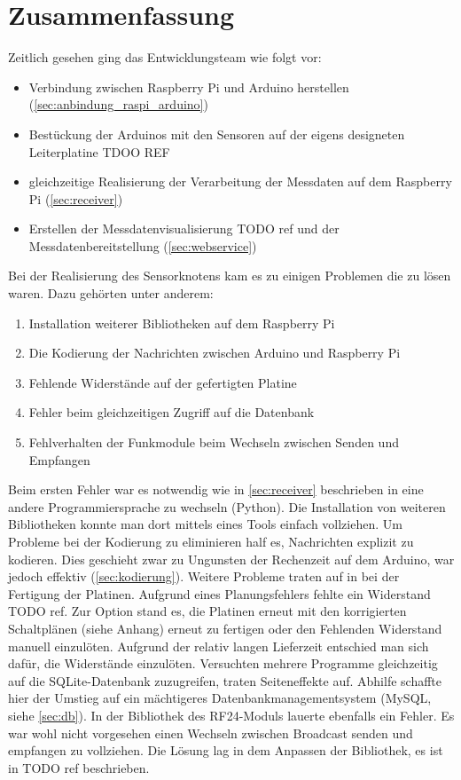 \section{Zusammenfassung}
Zeitlich gesehen ging das Entwicklungsteam wie folgt vor:
\begin{itemize}
\item Verbindung zwischen Raspberry Pi und Arduino herstellen (\ref{sec:anbindung_raspi_arduino})
\item Bestückung der Arduinos mit den Sensoren auf der eigens designeten Leiterplatine TDOO REF
\item gleichzeitige Realisierung der Verarbeitung der Messdaten auf dem Raspberry Pi (\ref{sec:receiver})
\item Erstellen der Messdatenvisualisierung TODO ref und der Messdatenbereitstellung (\ref{sec:webservice}) 
\end{itemize}

Bei der Realisierung des Sensorknotens kam es zu einigen Problemen die zu lösen waren. Dazu gehörten unter anderem:
\begin{enumerate}
\item Installation weiterer Bibliotheken auf dem Raspberry Pi
\item Die Kodierung der Nachrichten zwischen Arduino und Raspberry Pi
\item Fehlende Widerstände auf der gefertigten Platine
\item Fehler beim gleichzeitigen Zugriff auf die Datenbank
\item Fehlverhalten der Funkmodule beim Wechseln zwischen Senden und Empfangen
\end{enumerate}

Beim ersten Fehler war es notwendig wie in  \ref{sec:receiver} beschrieben in eine andere Programmiersprache zu wechseln (Python). Die Installation von weiteren Bibliotheken konnte man dort mittels eines Tools einfach vollziehen. 
Um Probleme bei der Kodierung zu eliminieren half es, Nachrichten explizit zu kodieren. Dies geschieht zwar zu Ungunsten der Rechenzeit auf dem Arduino, war jedoch effektiv (\ref{sec:kodierung}). 
Weitere Probleme traten auf in bei der Fertigung der Platinen. Aufgrund eines Planungsfehlers fehlte ein Widerstand TODO ref. Zur Option stand es, die Platinen erneut mit den korrigierten Schaltplänen (siehe Anhang) erneut zu fertigen oder den Fehlenden Widerstand manuell einzulöten. Aufgrund der relativ langen Lieferzeit entschied man sich dafür, die Widerstände einzulöten.
Versuchten mehrere Programme gleichzeitig auf die SQLite-Datenbank zuzugreifen, traten Seiteneffekte auf. Abhilfe schaffte hier der Umstieg auf ein mächtigeres Datenbankmanagementsystem (MySQL, siehe \ref{sec:db}).
In der Bibliothek des RF24-Moduls lauerte ebenfalls ein Fehler. Es war wohl nicht vorgesehen einen Wechseln zwischen Broadcast senden und empfangen zu vollziehen. Die Lösung lag in dem Anpassen der Bibliothek, es ist in TODO ref beschrieben.
